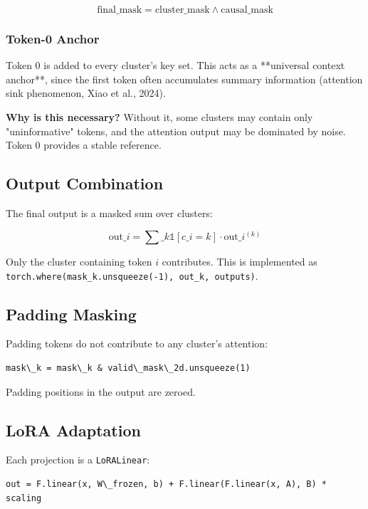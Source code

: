\[
\text{final\_mask} = \text{cluster\_mask} \wedge \text{causal\_mask}
\tag{4.5}
\]

\subsubsection{Token-0 Anchor}

Token 0 is added to every cluster's key set. This acts as a **universal 
context anchor**, since the first token often accumulates summary 
information (attention sink phenomenon, Xiao et al., 2024).

\textbf{Why is this necessary?} Without it, some clusters may contain only 
"uninformative" tokens, and the attention output may be dominated by 
noise. Token 0 provides a stable reference.

\subsection{Output Combination}

The final output is a masked sum over clusters:

\[
\text{out}\_i = \sum\_k \mathbb{1}[c\_i = k] \cdot \text{out}\_i^{(k)}
\tag{4.6}
\]

Only the cluster containing token $i$ contributes. This is implemented as 
\texttt{torch.where(mask\_k.unsqueeze(-1), out\_k, outputs)}.

\subsection{Padding Masking}

Padding tokens do not contribute to any cluster's attention:

\begin{lstlisting}
mask\_k = mask\_k & valid\_mask\_2d.unsqueeze(1)
\end{lstlisting}

Padding positions in the output are zeroed.

\subsection{LoRA Adaptation}

Each projection is a \texttt{LoRALinear}:

\begin{lstlisting}
out = F.linear(x, W\_frozen, b) + F.linear(F.linear(x, A), B) * scaling
\end{lstlisting}

